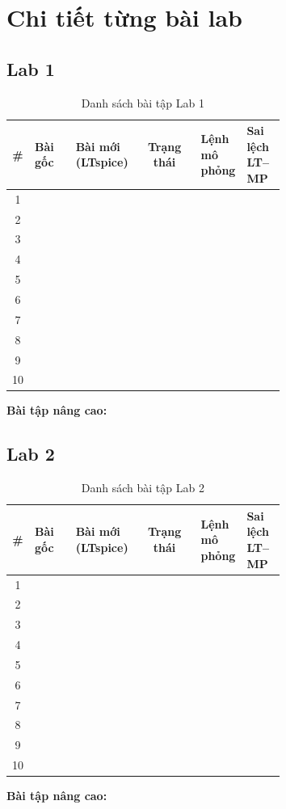 \section{Chi tiết từng bài lab}

\subsection{Lab 1}
\renewcommand{\arraystretch}{1.25}
\begin{longtable}{c >{\raggedright}p{0.15\linewidth} >{\raggedright}p{0.22\linewidth} c >{\raggedright}p{0.16\linewidth} p{0.14\linewidth}}
\caption{Danh sách bài tập Lab 1}\\
\toprule
\textbf{\#} & \textbf{Bài gốc} & \textbf{Bài mới (LTspice)} & \textbf{Trạng thái} & \textbf{Lệnh mô phỏng} & \textbf{Sai lệch LT--MP} \\ \midrule
1 & & & & & \\
2 & & & & & \\
3 & & & & & \\
4 & & & & & \\
5 & & & & & \\
6 & & & & & \\
7 & & & & & \\
8 & & & & & \\
9 & & & & & \\
10 & & & & & \\
\bottomrule
\end{longtable}
\noindent\textbf{Bài tập nâng cao:} 

\subsection{Lab 2}
\renewcommand{\arraystretch}{1.25}
\begin{longtable}{c >{\raggedright}p{0.15\linewidth} >{\raggedright}p{0.22\linewidth} c >{\raggedright}p{0.16\linewidth} p{0.14\linewidth}}
\caption{Danh sách bài tập Lab 2}\\
\toprule
\textbf{\#} & \textbf{Bài gốc} & \textbf{Bài mới (LTspice)} & \textbf{Trạng thái} & \textbf{Lệnh mô phỏng} & \textbf{Sai lệch LT--MP} \\ \midrule
1 & & & & & \\
2 & & & & & \\
3 & & & & & \\
4 & & & & & \\
5 & & & & & \\
6 & & & & & \\
7 & & & & & \\
8 & & & & & \\
9 & & & & & \\
10 & & & & & \\
\bottomrule
\end{longtable}
\noindent\textbf{Bài tập nâng cao:} 

